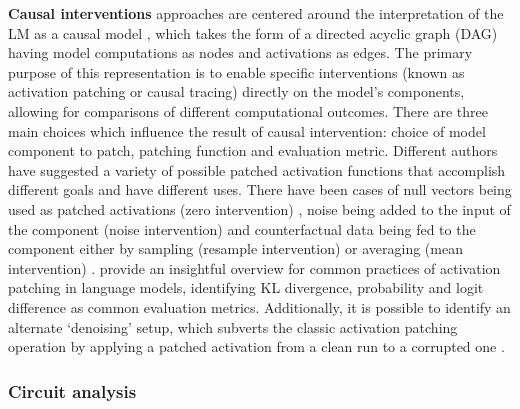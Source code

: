 \textbf{Causal interventions} approaches are centered around the interpretation of the LM as a causal model \cite{geiger2021}, which takes the form of a directed acyclic graph (DAG) having model computations as nodes and activations as edges.
The primary purpose of this representation is to enable specific interventions (known as activation patching or causal tracing) directly on the model's components, allowing for comparisons of different computational outcomes.
There are three main choices which influence the result of causal intervention: choice of model component to patch, patching function and evaluation metric.
Different authors have suggested a variety of possible patched activation functions that accomplish different goals and have different uses.
There have been cases of null vectors being used as patched activations (zero intervention) \cite{olsson2022, mohebbi2023}, noise being added to the input of the component (noise intervention) \cite{meng2022} and counterfactual data being fed to the component either by sampling (resample intervention) \cite{hanna2023, conmy2023} or averaging (mean intervention) \cite{wang2022}.
\citet{zhang2024} provide an insightful overview for common practices of activation patching in language models, identifying KL divergence, probability and logit difference as common evaluation metrics.
Additionally, it is possible to identify an alternate `denoising' setup, which subverts the classic activation patching operation by applying a patched activation from a clean run to a corrupted one \cite{lieberum2023, meng2022}.


\subsubsection{Circuit analysis}

